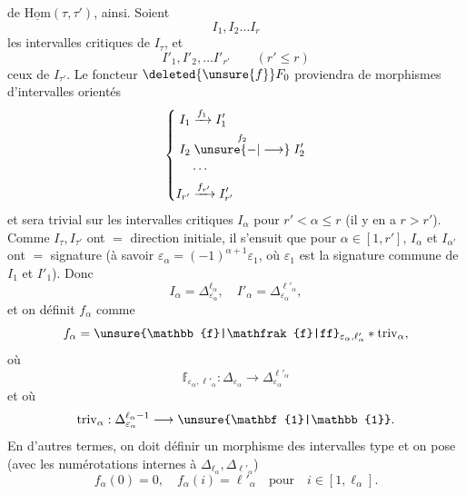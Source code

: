  de $\underline{\mathrm{Hom}}(\tau,\tau')$, ainsi. Soient
\[
I_1,I_2\ldots I_r
\]
les intervalles critiques de $I_\tau$, et
\[
I'_1,I'_2,\ldots I'_{r'}\qquad(r'\leq r)
\]
ceux de $I_{\tau'}$. Le foncteur $\deleted{\unsure{f}}F_0$ proviendra de morphismes d'intervalles orientés 
\[
\left\{\begin{aligned}
I_1&\xrightarrow{f_1}I'_1\\
I_2&\mathrel{\overset{f_2}{\unsure{-|\longrightarrow}}}I'_2\\
&\cdots\\
I_{r'}&\xrightarrow{f_{r'}}I'_{r'}
\end{aligned}\right.
\]
et sera  trivial sur les intervalles critiques $I_\alpha$ pour $r'<\alpha\leq r$ (il y en a  $r>r'$). Comme $I_\tau,I_{\tau'}$ ont $=$ direction initiale,  il s'ensuit que pour $\alpha\in[1,r']$, $I_\alpha$ et $I_{\alpha'}$ ont $=$ signature (à savoir $\varepsilon_\alpha=(-1)^{\alpha+1}\varepsilon_1$, où $\varepsilon_1$ est la signature commune de $I_1$ et $I'_1$). Donc
\[
I_\alpha=\Delta_{\varepsilon_\alpha}^{\ell_\alpha},\quad I'_\alpha=\Delta_{\varepsilon_\alpha}^{\ell'_\alpha},
\]
et on définit $f_\alpha$ comme 
\[
f_\alpha=\unsure{\mathbb{f}|\mathfrak{f}|ff}_{\varepsilon_\alpha,\ell'_\alpha}*\mathrm{triv}_\alpha,
\]
où
\[
\mathbb{f}_{\varepsilon_\alpha,\ell'_\alpha}:\Delta_{\varepsilon_\alpha}\longrightarrow\Delta_{\varepsilon_\alpha}^{\ell'_\alpha}
\]
et où
\[
\mathrm{triv}_\alpha:\Delta_{\varepsilon_\alpha}^{\ell_\alpha-1}\longrightarrow\unsure{\mathbf{1}|\mathbb{1}}.
\]
En d'autres termes,   on doit définir un morphisme des intervalles type
et on pose (avec les numérotations internes à $\mathbb{\Delta}_{\ell_\alpha},\mathbb{\Delta}_{\ell'_\alpha}$)
\[
f_\alpha(0)=0,\quad f_\alpha(i)=\ell'_\alpha\quad\text{pour}\quad i\in[1,\ell_\alpha].
\]
